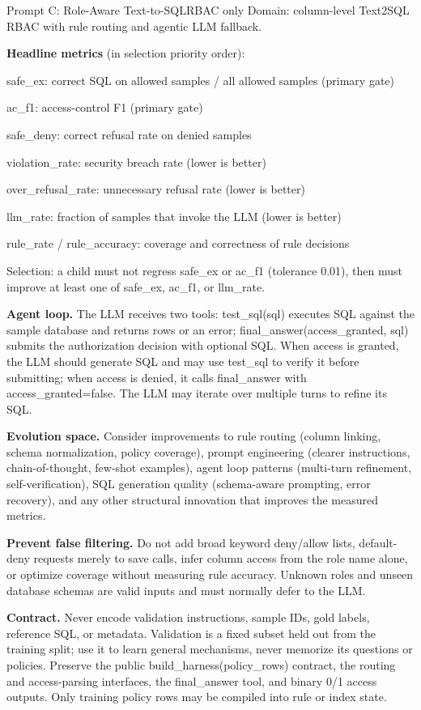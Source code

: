 \documentclass[11pt,a4paper]{article}
\newcommand{\phead}[1]{{\color{lopdteal!85!black}\bfseries #1}}
\begin{document}
\begin{promptbox}{Prompt C: Role-Aware Text-to-SQL}{RBAC only}
Domain: column-level Text2SQL RBAC with rule routing and agentic LLM fallback.

\smallskip
\phead{Headline metrics} (in selection priority order):
\begin{plist}
\item safe\_ex: correct SQL on allowed samples / all allowed samples (primary gate)
\item ac\_f1: access-control F1 (primary gate)
\item safe\_deny: correct refusal rate on denied samples
\item violation\_rate: security breach rate (lower is better)
\item over\_refusal\_rate: unnecessary refusal rate (lower is better)
\item llm\_rate: fraction of samples that invoke the LLM (lower is better)
\item rule\_rate / rule\_accuracy: coverage and correctness of rule decisions
\end{plist}
Selection: a child must not regress safe\_ex or ac\_f1 (tolerance 0.01), then must improve at least one of safe\_ex, ac\_f1, or llm\_rate.

\smallskip
\phead{Agent loop.} The LLM receives two tools: test\_sql(sql) executes SQL against the sample database and returns rows or an error; final\_answer(access\_granted, sql) submits the authorization decision with optional SQL. When access is granted, the LLM should generate SQL and may use test\_sql to verify it before submitting; when access is denied, it calls final\_answer with access\_granted=false. The LLM may iterate over multiple turns to refine its SQL.

\smallskip
\phead{Evolution space.} Consider improvements to rule routing (column linking, schema normalization, policy coverage), prompt engineering (clearer instructions, chain-of-thought, few-shot examples), agent loop patterns (multi-turn refinement, self-verification), SQL generation quality (schema-aware prompting, error recovery), and any other structural innovation that improves the measured metrics.

\smallskip
\phead{Prevent false filtering.} Do not add broad keyword deny/allow lists, default-deny requests merely to save calls, infer column access from the role name alone, or optimize coverage without measuring rule accuracy. Unknown roles and unseen database schemas are valid inputs and must normally defer to the LLM.

\smallskip
\phead{Contract.} Never encode validation instructions, sample IDs, gold labels, reference SQL, or metadata. Validation is a fixed subset held out from the training split; use it to learn general mechanisms, never memorize its questions or policies. Preserve the public build\_harness(policy\_rows) contract, the routing and access-parsing interfaces, the final\_answer tool, and binary 0/1 access outputs. Only training policy rows may be compiled into rule or index state.
\end{promptbox}
\end{document}
